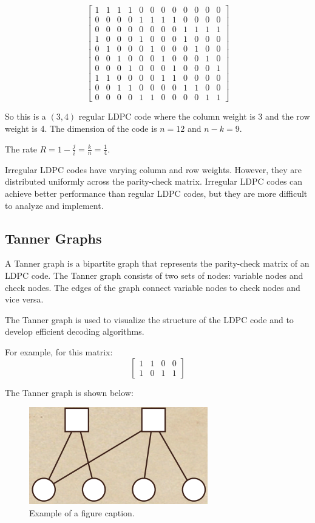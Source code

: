 \documentclass[conference]{IEEEtran}
\begin{document}
$$\begin{bmatrix}
  1 & 1 & 1 & 1 & 0 & 0 & 0 & 0 & 0 & 0 & 0 & 0\\
  0 & 0 & 0 & 0 & 1 & 1 & 1 & 1 & 0 & 0 & 0 & 0\\
  0 & 0 & 0 & 0 & 0 & 0 & 0 & 0 & 1 & 1 & 1 & 1\\
  1 & 0 & 0 & 0 & 1 & 0 & 0 & 0 & 1 & 0 & 0 & 0\\
  0 & 1 & 0 & 0 & 0 & 1 & 0 & 0 & 0 & 1 & 0 & 0\\
  0 & 0 & 1 & 0 & 0 & 0 & 1 & 0 & 0 & 0 & 1 & 0\\
  0 & 0 & 0 & 1 & 0 & 0 & 0 & 1 & 0 & 0 & 0 & 1\\
  1 & 1 & 0 & 0 & 0 & 0 & 1 & 1 & 0 & 0 & 0 & 0\\
  0 & 0 & 1 & 1 & 0 & 0 & 0 & 0 & 1 & 1 & 0 & 0\\
  0 & 0 & 0 & 0 & 1 & 1 & 0 & 0 & 0 & 0 & 1 & 1
\end{bmatrix}$$

So this is a $(3,4)$ regular LDPC code where the column weight is 3 and the row weight is 4. The dimension of the code is $n=12$ and $n-k=9$.

The rate $R=1-\frac{j}{i}=\frac{k}{n}=\frac{1}{4}$.

Irregular LDPC codes have varying column and row weights.
However, they are distributed uniformly across the parity-check matrix.
Irregular LDPC codes can achieve better performance than regular LDPC codes, but they are more difficult to analyze and implement.

\subsection{Tanner Graphs}
A Tanner graph is a bipartite graph that represents the parity-check matrix of an LDPC code. The Tanner graph consists of two sets of nodes: variable nodes and check nodes. The edges of the graph connect variable nodes to check nodes and vice versa.

The Tanner graph is used to visualize the structure of the LDPC code and to develop efficient decoding algorithms.

For example, for this matrix: \[
    \begin{bmatrix}
        1 & 1 & 0 & 0\\
        1 & 0 & 1 & 1
    \end{bmatrix}
\]

The Tanner graph is shown below:

\begin{figure}[htbp]
\centerline{\includegraphics{Images/tanner_graph.png}}
\caption{Example of a figure caption.}
\label{fig}
\end{figure}
\end{document}
